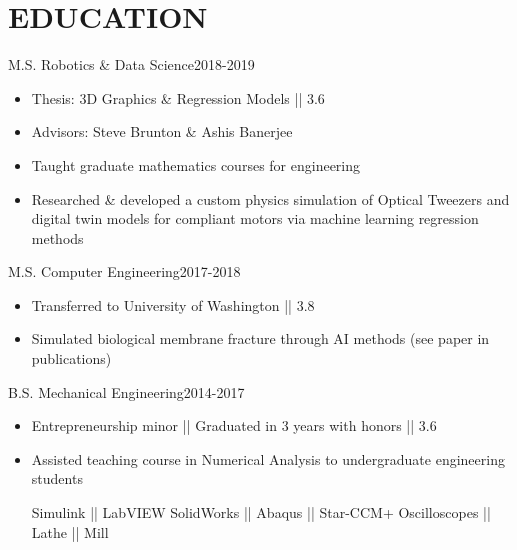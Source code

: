 \section*{EDUCATION}


\subtitle{University of Washington}{M.S. Robotics \& Data Science}{2018-2019}

\begin{itemize}
    \item Thesis: 3D Graphics \& Regression Models || 3.6
    \item Advisors: Steve Brunton \& Ashis Banerjee
    \item Taught graduate mathematics courses for engineering
    \item Researched \& developed a custom physics simulation of Optical Tweezers and digital twin models for compliant motors via machine learning regression methods


\end{itemize}


\subtitle{Santa Clara University}{M.S. Computer Engineering}{2017-2018}

\begin{itemize}
    \item Transferred to University of Washington || 3.8 
    \item Simulated biological membrane fracture through AI methods (see paper in publications)
   
    
\end{itemize}

\subtitle{Santa Clara University}{B.S. Mechanical Engineering}{2014-2017}

\begin{itemize}
    \item Entrepreneurship minor || Graduated in 3 years with honors || 3.6
    \item Assisted teaching course in Numerical Analysis to undergraduate engineering students
    
        {Simulink || LabVIEW}
        {SolidWorks || Abaqus || Star-CCM+}
        {Oscilloscopes || Lathe || Mill}

\end{itemize}

